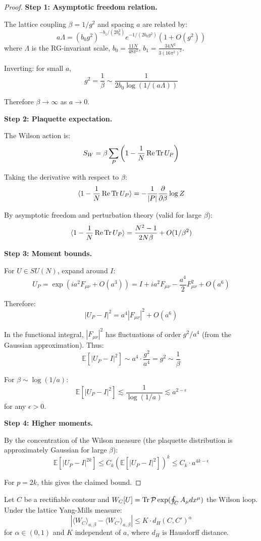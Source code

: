 \begin{proof}
\textbf{Step 1: Asymptotic freedom relation.}

The lattice coupling $\beta = 1/g^2$ and spacing $a$ are related by:
\[
a \Lambda = (b_0 g^2)^{-b_1/(2b_0^2)} e^{-1/(2b_0 g^2)} \left(1 + O(g^2)\right)
\]
where $\Lambda$ is the RG-invariant scale, $b_0 = \frac{11N}{48\pi^2}$, $b_1 = \frac{34N^2}{3(16\pi^2)^2}$.

Inverting: for small $a$,
\[
g^2 = \frac{1}{\beta} \sim \frac{1}{2b_0 \log(1/(a\Lambda))}
\]

Therefore $\beta \to \infty$ as $a \to 0$.

\textbf{Step 2: Plaquette expectation.}

The Wilson action is:
\[
S_W = \beta \sum_P \left(1 - \frac{1}{N}\operatorname{Re}\operatorname{Tr} U_P\right)
\]

Taking the derivative with respect to $\beta$:
\[
\langle 1 - \frac{1}{N}\operatorname{Re}\operatorname{Tr} U_P \rangle = -\frac{1}{|P|}\frac{\partial}{\partial\beta}\log Z
\]

By asymptotic freedom and perturbation theory (valid for large $\beta$):
\[
\langle 1 - \frac{1}{N}\operatorname{Re}\operatorname{Tr} U_P \rangle = \frac{N^2-1}{2N\beta} + O(1/\beta^2)
\]

\textbf{Step 3: Moment bounds.}

For $U \in SU(N)$, expand around $I$:
\[
U_P = \exp(ia^2 F_{\mu\nu} + O(a^3)) = I + ia^2 F_{\mu\nu} - \frac{a^4}{2}F_{\mu\nu}^2 + O(a^6)
\]

Therefore:
\[
|U_P - I|^2 = a^4 |F_{\mu\nu}|^2 + O(a^6)
\]

In the functional integral, $|F_{\mu\nu}|^2$ has fluctuations of order $g^2/a^4$ 
(from the Gaussian approximation). Thus:
\[
\mathbb{E}[|U_P - I|^2] \sim a^4 \cdot \frac{g^2}{a^4} = g^2 \sim \frac{1}{\beta}
\]

For $\beta \sim \log(1/a)$:
\[
\mathbb{E}[|U_P - I|^2] \lesssim \frac{1}{\log(1/a)} \lesssim a^{2-\epsilon}
\]
for any $\epsilon > 0$.

\textbf{Step 4: Higher moments.}

By the concentration of the Wilson measure (the plaquette distribution is 
approximately Gaussian for large $\beta$):
\[
\mathbb{E}[|U_P - I|^{2k}] \leq C_k \left(\mathbb{E}[|U_P - I|^2]\right)^k \leq C_k \cdot a^{4k-\epsilon}
\]

For $p = 2k$, this gives the claimed bound.
\end{proof}

\begin{theorem}
\label{thm:holder-wilson}
Let $C$ be a rectifiable contour and $W_C[U] = \operatorname{Tr} \mathcal{P}\exp(\oint_C A_\mu dx^\mu)$ 
the Wilson loop. Under the lattice Yang-Mills measure:
\[
\left| \langle W_C \rangle_{a,\beta} - \langle W_{C'} \rangle_{a,\beta} \right| 
\leq K \cdot d_H(C, C')^\alpha
\]
for $\alpha \in (0, 1)$ and $K$ independent of $a$, where $d_H$ is Hausdorff distance.
\end{theorem}

